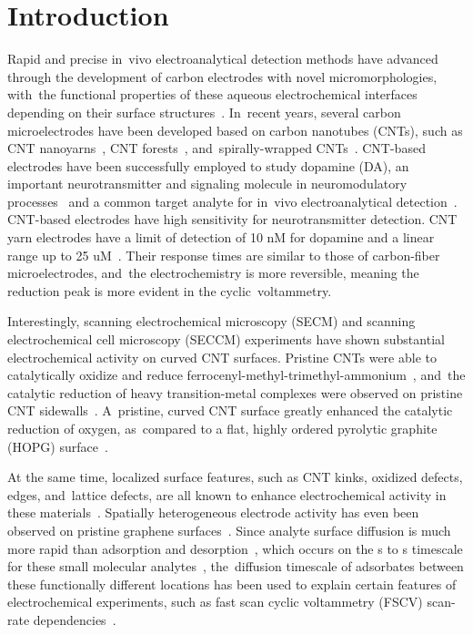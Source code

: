 \documentclass[molecules,article,accept,pdftex,moreauthors]{Definitions/mdpi}
\begin{document}
\section{Introduction}
\label{sec:introduction}

Rapid and precise in~vivo electroanalytical detection methods have advanced through the development of carbon electrodes with novel micromorphologies, with~the functional properties of these aqueous electrochemical interfaces depending on their surface structures~\cite{Cao2019,Yang2015}. In~recent years, several carbon microelectrodes have been developed based on carbon nanotubes (CNTs), such as CNT nanoyarns~\cite{Yang2016}, CNT forests~\cite{Xiao2012}, and~spirally-wrapped CNTs~\cite{Kim2020}. CNT-based electrodes have been successfully employed to study dopamine (DA), an important neurotransmitter and signaling molecule in neuromodulatory processes~\cite{Feng2015, Salamon2015, Taylor2017} and a common target analyte for in~vivo electroanalytical detection~\cite{Yang2015, fscv_review2017, Wightman2006}. CNT-based electrodes have high sensitivity for neurotransmitter detection. CNT yarn electrodes have a limit of detection of 10 nM for dopamine and a linear range up to 25 uM~\cite{Jacobs2014}. Their response times are similar to those of carbon-fiber microelectrodes, and~the electrochemistry is more reversible, meaning the reduction peak is more evident in the cyclic~voltammetry.
\newpage

Interestingly, scanning electrochemical microscopy (SECM) and scanning electrochemical cell microscopy (SECCM) experiments have shown substantial electrochemical activity on curved CNT surfaces. Pristine CNTs were able to catalytically oxidize and reduce ferrocenyl-methyl-trimethyl-ammonium~\cite{ac2010kim}, and~the catalytic reduction of heavy transition-metal complexes were observed on pristine CNT sidewalls~\cite{Guell2014}. A~pristine, curved CNT surface greatly enhanced the catalytic reduction of oxygen, as~compared to a flat, highly ordered pyrolytic graphite (HOPG) surface~\cite{Byers2014}.

At the same time, localized surface features, such as CNT kinks, oxidized defects, edges, and~lattice defects, are all known to enhance electrochemical activity in these materials~\cite{Yang2015,Byers2014,Carbone2015}. Spatially heterogeneous electrode activity has even been observed on pristine graphene surfaces~\cite{Chen2021}. Since analyte surface diffusion is much more rapid than adsorption and desorption~\cite{Ma2016,Jia2022}, which occurs on the \textmu s to s timescale for these small molecular analytes~\cite{Venton2002, Bath2001, jpa2014holcman}, the~diffusion timescale of adsorbates between these functionally different locations has been used to explain certain features of electrochemical experiments, such as fast scan cyclic voltammetry (FSCV) scan-rate dependencies~\cite{Oleinick2018}.
\end{document}
